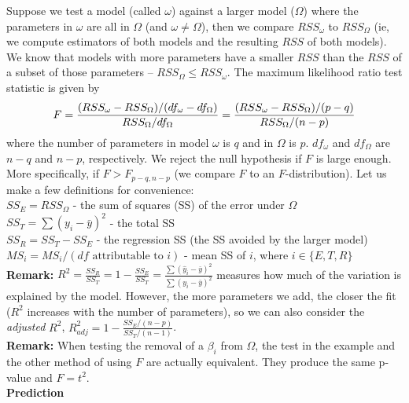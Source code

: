 \documentclass[11pt]{article}
\begin{document}
Suppose we test a model (called $\omega$) against a larger model ($\Omega$) where the parameters in $\omega$ are all in $\Omega$ (and $\omega \neq \Omega$), then we compare $RSS_{\omega}$ to $RSS_{\Omega}$ (ie, we compute estimators of both models and the resulting $RSS$ of both models). We know that models with more parameters have a smaller $RSS$ than the $RSS$ of a subset of those parameters -- $RSS_{\Omega} \leq RSS_{\omega}$. The maximum likelihood ratio test statistic is given by
\begin{eqnarray}
F = \frac{(RSS_{\omega} - RSS_{\Omega})/(df_{\omega}-df_{\Omega})}{RSS_{\Omega}/df_{\Omega}}
  = \frac{(RSS_{\omega} - RSS_{\Omega})/(p-q)}{RSS_{\Omega}/(n-p)} \notag
\end{eqnarray}
where the number of parameters in model $\omega$ is $q$ and in $\Omega$ is $p$. $df_{\omega}$ and $df_{\Omega}$ are $n-q$ and $n-p$, respectively. We reject the null hypothesis if $F$ is large enough. More specifically, if $F>F_{p-q,n-p}$ (we compare $F$ to an $F$-distribution). Let us make a few definitions for convenience: \\
\indent$SS_E = RSS_{\Omega}$ - the sum of squares (SS) of the error under $\Omega$ \\
\indent$SS_T = \sum{(y_i-\bar{y})^2}$ - the total SS \\
\indent$SS_R = SS_T - SS_E$ - the regression SS (the SS avoided by the larger model) \\
\indent$MS_i = MS_i/(df\text{ attributable to }i)$ - mean SS of $i$, where $i \in \{ E,T,R \}$  \\

\noindent\textbf{Remark:} $R^2 = \frac{SS_R}{SS_T} = 1-\frac{SS_E}{SS_T} = \frac{\sum{(\hat{y}_i-\bar{y})^2}}{\sum{(y_i-\bar{y})^2}}$ measures how much of the variation is explained by the model. However, the more parameters we add, the closer the fit ($R^2$ increases with the number of parameters), so we can also consider the \textit{adjusted} $R^2$, $R_{adj}^2 = 1 - \frac{SS_E/(n-p)}{SS_T/(n-1)}$.\\

\noindent\textbf{Remark:} When testing the removal of a $\beta_i$ from $\Omega$, the test in the example and the other method of using $F$ are actually equivalent. They produce the same p-value and $F=t^2$. \\

\noindent\textbf{Prediction} \\
\end{document}
